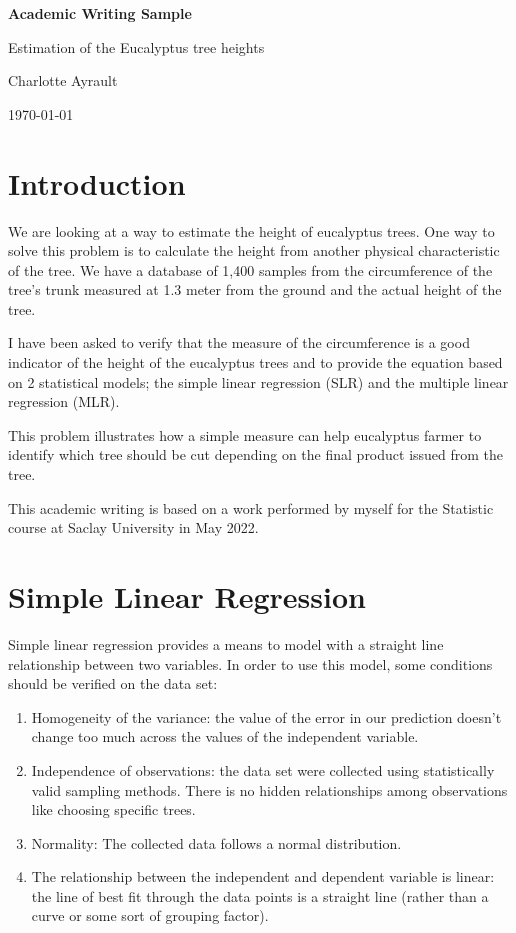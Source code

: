 \documentclass[
	12pt, %
]{article}
\theoremstyle{definition}
\newcommand{\maketitletwo}{
\begin{center}
    \Large{\textbf{Academic Writing Sample}
        
        Estimation of the Eucalyptus tree heights} %
    \vspace{5pt}
    
    \normalsize{Charlotte Ayrault  %
    
    \today}        %
    \vspace{15pt}
\end{center}}
\begin{document}
\maketitletwo 


\section{Introduction}
We are looking at a way to estimate the height of eucalyptus trees. One way to solve this problem is to calculate the height from another physical characteristic of the tree. We have a database of 1,400 samples from the circumference of the tree's trunk measured at 1.3 meter from the ground and the actual height of the tree. 

\smallskip
I have been asked to verify that the measure of the circumference is a good indicator of the height of the eucalyptus trees and to provide the equation based on 2 statistical models; the simple linear regression (SLR) and the multiple linear regression (MLR).


\smallskip
This problem illustrates how a simple measure can help eucalyptus farmer to identify which tree should be cut depending on the final product issued from the tree.

\medskip
This academic writing is based on a work performed by myself for the Statistic course at Saclay University in May 2022.

\section{Simple Linear Regression}

Simple linear regression provides a means to model with a straight line relationship between two variables. In order to use this model, some conditions should be verified on the data set:
\begin{enumerate}
    \item Homogeneity of the variance: the value of the error in our prediction doesn't change too much across the values of the independent variable. 

    \item Independence of observations: the data set were collected using statistically valid sampling methods. There is no hidden relationships among observations like choosing specific trees.

    \item Normality: The collected data follows a normal distribution. 
    
    \item The relationship between the independent and dependent variable is linear: the line of best fit through the data points is a straight line (rather than a curve or some sort of grouping factor).
\end{enumerate} 
\end{document}
